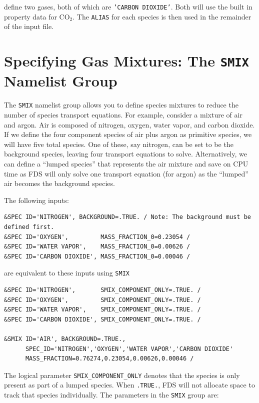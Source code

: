 \documentclass[11pt]{book}
\newcommand{\ct}{\tt\small}
\begin{document}
\noindent define two gases, both of which are {\ct 'CARBON DIOXIDE'}.  Both will use the built in property data for CO$_2$.  The {\ct ALIAS} for each species is then used in the remainder of the input file.




\clearpage

\section{Specifying Gas Mixtures: The \texorpdfstring{{\tt SMIX}}{SMIX} Namelist Group}
\label{info:SMIX}

The {\ct SMIX} namelist group allows you to define species mixtures to reduce the number of species transport equations.
For example, consider a mixture of air and argon. Air is composed of nitrogen, oxygen, water vapor, and carbon dioxide. If we define the four component species of air plus argon as primitive species, we will have five total species. One of these, say nitrogen, can be set to be the background species, leaving four transport equations to solve.
Alternatively, we can define a ``lumped species'' that represents the air mixture and save on CPU time as FDS will only solve one transport equation (for argon) as the ``lumped'' air becomes the background species.


The following inputs:

\footnotesize
\begin{verbatim}
&SPEC ID='NITROGEN', BACKGROUND=.TRUE. / Note: The background must be defined first.
&SPEC ID='OXYGEN',         MASS_FRACTION_0=0.23054 /
&SPEC ID='WATER VAPOR',    MASS_FRACTION_0=0.00626 /
&SPEC ID='CARBON DIOXIDE', MASS_FRACTION_0=0.00046 /
\end{verbatim} \normalsize

\noindent
are equivalent to these inputs using {\ct SMIX}

\footnotesize
\begin{verbatim}
&SPEC ID='NITROGEN',       SMIX_COMPONENT_ONLY=.TRUE. /
&SPEC ID='OXYGEN',         SMIX_COMPONENT_ONLY=.TRUE. /
&SPEC ID='WATER VAPOR',    SMIX_COMPONENT_ONLY=.TRUE. /
&SPEC ID='CARBON DIOXIDE', SMIX_COMPONENT_ONLY=.TRUE. /

&SMIX ID='AIR', BACKGROUND=.TRUE.,
      SPEC_ID='NITROGEN','OXYGEN','WATER VAPOR','CARBON DIOXIDE'
      MASS_FRACTION=0.76274,0.23054,0.00626,0.00046 /
\end{verbatim} \normalsize

\noindent
The logical parameter {\ct SMIX\_COMPONENT\_ONLY} denotes that the species is only present as part of a lumped species. When {\ct .TRUE.}, FDS will not allocate space to track that species individually. The parameters in the {\ct SMIX} group are:
\end{document}
